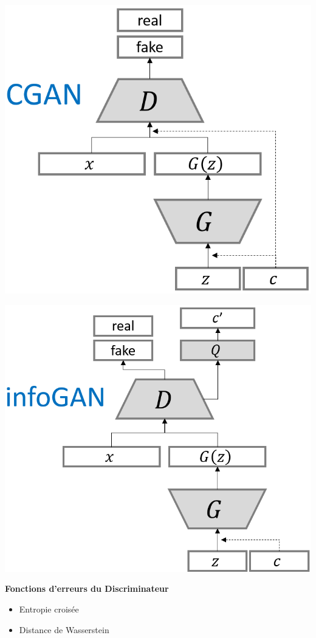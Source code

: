\documentclass[a0,portrait]{a0poster}
\begin{document}
\begin{multicols}{2}
\begin{tcolorbox}[colback=blue!5!white,colframe=blue!75!black,title={\section*{Types de GANs}}]
\begin{center}
\begin{minipage}{0.31\textwidth}
    \includegraphics[width=1.0\textwidth]{./CGAN_structure.png}
\end{minipage}
\begin{minipage}{0.35\textwidth}
    \includegraphics[width=1.0\textwidth]{./INFOGAN_structure.png}
\end{minipage}
\end{center}
\textbf{Fonctions d'erreurs du Discriminateur}
\begin{itemize}
    \item Entropie croisée
    \item Distance de Wasserstein
\end{itemize}
\end{tcolorbox}
\bigskip


\end{multicols}
\end{document}
